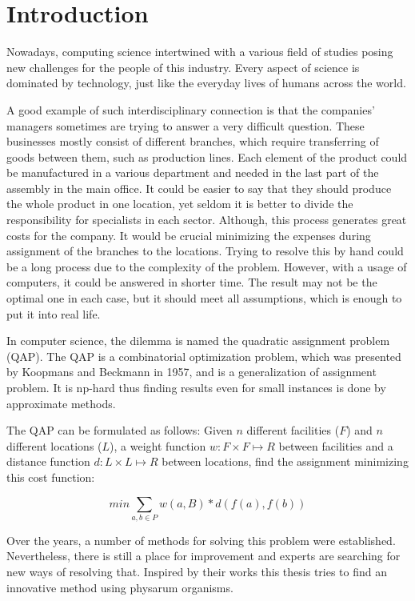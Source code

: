 \chapter{Introduction}
\label{chapter:introduction}

Nowadays, computing science intertwined with a various field of studies posing new challenges for the people of this industry.  Every aspect of science is dominated by technology, just like the everyday lives of humans across the world.

A good example of such interdisciplinary connection is that the companies' managers sometimes are trying to answer a very difficult question. These businesses mostly consist of different branches, which require transferring of goods between them, such as production lines. Each element of the product could be manufactured in a various department and needed in the last part of the assembly in the main office. It could be easier to say that they should produce the whole product in one location, yet seldom it is better to divide the responsibility for specialists in each sector. Although, this process generates great costs for the company. It would be crucial minimizing the expenses during assignment of the branches to the locations. Trying to resolve this by hand could be a long process due to the complexity of the problem. However, with a usage of computers, it could be answered in shorter time. The result may not be the optimal one in each case, but it should meet all assumptions, which is enough to put it into real life.

In computer science, the dilemma is named the quadratic assignment problem (QAP).  The QAP is a combinatorial optimization problem, which was presented by Koopmans and Beckmann in 1957, and is a generalization of assignment problem. It is np-hard thus finding results even for small instances is done by approximate methods.

The QAP can be formulated as follows: Given $ n $ different facilities ($F$) and $ n $ different locations ($L$), a weight function $ w: F \times F \mapsto R $ between facilities and a distance function $ d: L \times L \mapsto R $ between locations, find the assignment minimizing this cost function:

\begin{equation}
min \sum_{a, b \in P } w(a, B) * d( f(a), f(b))
\end{equation}

Over the years, a number of methods for solving this problem were established. Nevertheless, there is still a place for improvement and experts are searching for new ways of resolving that. Inspired by their works this thesis tries to find an innovative method using physarum organisms.


